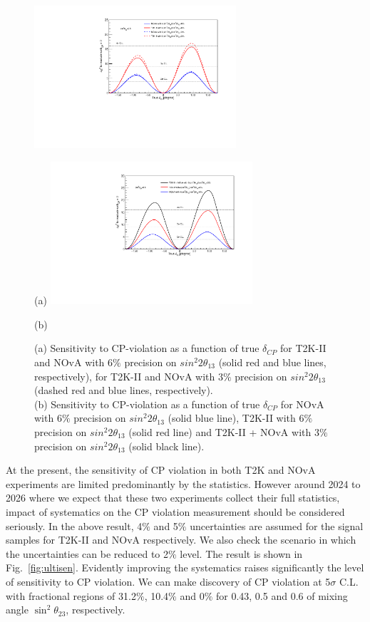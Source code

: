 \documentclass[a4 paper,12pt]{report}%
\begin{document}
  \begin{figure}[H]
 	\centering
 	\includegraphics[width=7.5cm]{improve_th13.pdf} 
 	\caption*{}{(a)}
	\label{fig:th13eff}
 \endminipage
 \hfill
\quad
 \centering
 \includegraphics[width=7.5cm]{improve_nova.pdf}
 \caption*{}{(b)}
 \label{fig:combine3react}
 \endminipage
  \caption{{\label{fig:sent2knova}} (a) Sensitivity to CP-violation as a function of true $\delta_{CP}$ for T2K-II and NOvA with $6\%$ precision on $sin^2{2\theta_{13}}$ (solid red and blue lines, respectively), for T2K-II and NOvA with $3\%$ precision on $sin^2{2\theta_{13}}$ (dashed red and blue lines, respectively).\\\hspace{\textwidth}
  (b) Sensitivity to CP-violation as a function of true $\delta_{CP}$ for NOvA with $6\%$ precision on $sin^2{2\theta_{13}}$ (solid blue line), T2K-II with $6\%$ precision on $sin^2{2\theta_{13}}$ (solid red line) and T2K-II + NOvA with $3\%$ precision on $sin^2{2\theta_{13}}$ (solid black line).}
 \hfill
 \end{figure}
 
At the present, the sensitivity of CP violation in both T2K and NOvA experiments are limited predominantly by the statistics. However around 2024 to 2026 where we expect that these two experiments collect their full statistics, impact of systematics on the CP violation measurement should be considered seriously. 
In the above result, 4$\%$ and 5$\%$ uncertainties are assumed for the signal samples for T2K-II and NOvA respectively. We also check the scenario in which the uncertainties can be reduced to 2$\%$ level. The result is shown in Fig.~\ref{fig:ultisen}. Evidently improving the systematics raises significantly the level of sensitivity to CP violation. We can make discovery of CP violation at 5$\sigma$ C.L. with fractional regions of 31.2$\%$, 10.4$\%$ and 0$\%$ for 0.43, 0.5 and 0.6 of mixing angle $\sin^2\theta_{23}$, respectively.
\end{document}
